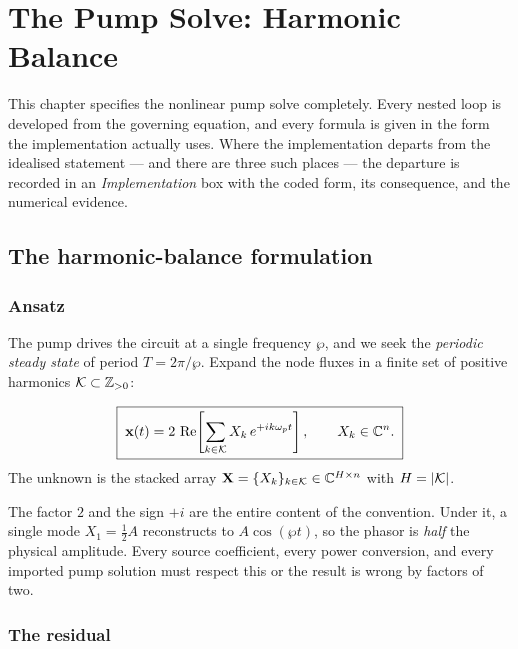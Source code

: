 \chapter{The Pump Solve: Harmonic Balance}
\label{chap:pumphb}

This chapter specifies the nonlinear pump solve completely. Every nested loop
is developed from the governing equation, and every formula is given in the
form the implementation actually uses. Where the implementation departs from the
idealised statement --- and there are three such places --- the departure is
recorded in an \emph{Implementation} box with the coded form, its consequence,
and the numerical evidence.

\section{The harmonic-balance formulation}

\subsection{Ansatz}

The pump drives the circuit at a single frequency $\wp$, and we seek the
\emph{periodic steady state} of period $T = 2\pi/\wp$. Expand the node fluxes in
a finite set of positive harmonics $\mathcal{K} \subset \mathbb{Z}_{>0}$:

\begin{convention}
\label{conv:phasor}
\begin{equation}
  \boxed{\;
  \mathbf{x}(t) = 2\,\operatorname{Re}\!\left[\sum_{k\in\mathcal{K}} X_k\,e^{+ik\omega_{p} t}\right],
  \qquad X_k\in\mathbb{C}^{n}.
  \;}
  \label{eq:synthesis}
\end{equation}
The unknown is the stacked array $\mathbf{X} = \{X_k\}_{k\in\mathcal{K}}\in
\mathbb{C}^{H\times n}$ with $H = |\mathcal{K}|$.
\end{convention}

The factor $2$ and the sign $+i$ are the entire content of the convention. Under
it, a single mode $X_1 = \tfrac12 A$ reconstructs to $A\cos(\wp t)$, so the
phasor is \emph{half} the physical amplitude. Every source coefficient, every
power conversion, and every imported pump solution must respect this or the
result is wrong by factors of two.

\subsection{The residual}

